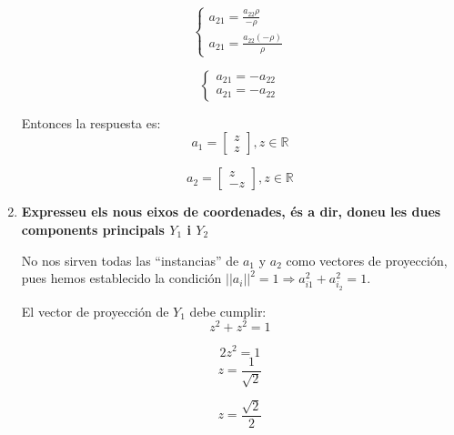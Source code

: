 \documentclass[a4paper,10pt]{article}
\begin{document}
\begin{enumerate}
  \begin{equation*}
    \begin{cases}
      a_{21} = \frac{a_{22}\rho}{-\rho} \\
      a_{21} = \frac{a_{22}(-\rho)}{\rho}
    \end{cases}
  \end{equation*}

  \begin{equation*}
    \begin{cases}
      a_{21} = -a_{22} \\
      a_{21} = -a_{22}
    \end{cases}
  \end{equation*}

  Entonces la respuesta es:
  \begin{equation*}
    a_1 =
    \begin{bmatrix}
      z \\ z
    \end{bmatrix}
    , z \in \mathbb{R}
  \end{equation*}

  \begin{equation*}
    a_2 =
    \begin{bmatrix}
      z \\ -z
    \end{bmatrix}
    , z \in \mathbb{R}
  \end{equation*}

  \item \textbf{Expresseu els nous eixos de coordenades, és a dir, doneu les dues components principals $Y_1$ i $Y_2$}

  No nos sirven todas las ``instancias'' de $a_1$ y $a_2$ como vectores de proyección, pues hemos establecido la condición $||a_i||^2 = 1 \Rightarrow a_{i1}^2 + a_{i_2}^2 = 1$.

  El vector de proyección de $Y_1$ debe cumplir:
  \begin{equation*}
    z^2 + z^2 = 1
  \end{equation*}

  \begin{equation*}
    2z^2 = 1
  \end{equation*}
  \begin{equation*}
    z = \frac{1}{\sqrt{2}}
  \end{equation*}

  \begin{equation*}
    z = \frac{\sqrt{2}}{2}
  \end{equation*}
\end{enumerate}
\end{document}
